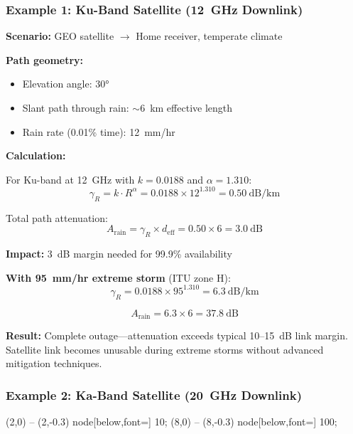 \subsubsection{Example 1: Ku-Band Satellite (12~GHz Downlink)}

\textbf{Scenario:} GEO satellite $\rightarrow$ Home receiver, temperate climate

\textbf{Path geometry:}
\begin{itemize}
\item Elevation angle: $30°$
\item Slant path through rain: $\sim$6~km effective length
\item Rain rate (0.01\% time): 12~mm/hr
\end{itemize}

\textbf{Calculation:}

For Ku-band at 12~GHz with $k = 0.0188$ and $\alpha = 1.310$:
\begin{equation}
\gamma_R = k \cdot R^\alpha = 0.0188 \times 12^{1.310} = 0.50~\text{dB/km}
\end{equation}

Total path attenuation:
\begin{equation}
A_{\text{rain}} = \gamma_R \times d_{\text{eff}} = 0.50 \times 6 = 3.0~\text{dB}
\end{equation}

\textbf{Impact:} 3~dB margin needed for 99.9\% availability

\textbf{With 95~mm/hr extreme storm} (ITU zone H):
\begin{equation}
\gamma_R = 0.0188 \times 95^{1.310} = 6.3~\text{dB/km}
\end{equation}

\begin{equation}
A_{\text{rain}} = 6.3 \times 6 = 37.8~\text{dB}
\end{equation}

\begin{warningbox}
\textbf{Result:} Complete outage---attenuation exceeds typical 10--15~dB link margin. Satellite link becomes unusable during extreme storms without advanced mitigation techniques.
\end{warningbox}

\subsubsection{Example 2: Ka-Band Satellite (20~GHz Downlink)}

 (2,0) -- (2,-0.3) node[below,font=\scriptsize] {10};
 (8,0) -- (8,-0.3) node[below,font=\scriptsize] {100};

